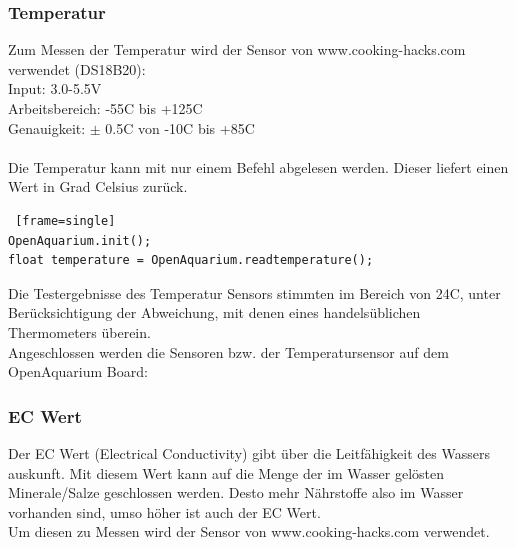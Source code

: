 \subsubsection{Temperatur}
Zum Messen der Temperatur wird der Sensor von www.cooking-hacks.com verwendet (DS18B20): \\
Input: 3.0-5.5V  \\
Arbeitsbereich: -55\degree C bis +125\degree C  \\
Genauigkeit: $\pm$ 0.5\degree C von -10\degree C bis +85\degree C \\ \mbox{}\\
Die Temperatur kann mit nur einem Befehl abgelesen werden. Dieser liefert einen Wert in Grad Celsius zur\"uck.
\begin{lstlisting} [frame=single]
OpenAquarium.init();
float temperature = OpenAquarium.readtemperature();
\end{lstlisting}
Die Testergebnisse des Temperatur Sensors stimmten im Bereich von 24\degree C, unter Ber\"ucksichtigung der Abweichung, mit denen eines handels\"ublichen Thermometers \"uberein.
\newpage \mbox{} \\
Angeschlossen werden die Sensoren bzw. der Temperatursensor auf dem OpenAquarium Board: \\
\begin{minipage}{5in}
  \centering
\end{minipage}

\subsubsection{EC Wert}
Der EC Wert (Electrical Conductivity) gibt über die Leitfähigkeit des Wassers auskunft. Mit diesem Wert kann auf die Menge der im Wasser gelösten Minerale/Salze geschlossen werden. Desto mehr N\"ahrstoffe also im Wasser vorhanden sind, umso h\"oher ist auch der EC Wert. \\
Um diesen zu Messen wird der Sensor von www.cooking-hacks.com verwendet.

